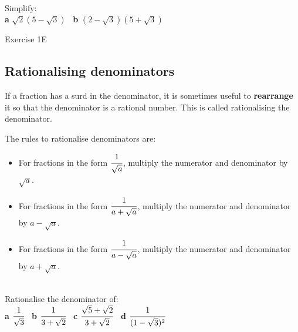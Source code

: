 \documentclass[fleqn]{article}
\begin{document}
\vspace{5cm}
\begin{examplebox}{}{}
	\\ %
	Simplify: \\
	\textbf{a}\hspace{2mm} $\sqrt{2}(5-\sqrt{3})$		\hspace{20mm} \
	\textbf{b}\hspace{2mm} $(2-\sqrt{3})(5+\sqrt{3})$	\hspace{20mm}
\end{examplebox}

\vfill
\begin{practice*}{Exercise 1E}{}
\end{practice*}
\newpage




\subsection{Rationalising denominators}
\begin{mybox2}[colbacktitle=green]{}
	If a fraction has a surd in the denominator, it is sometimes useful to \textbf{rearrange} it so that the denominator is a rational number. This is called rationalising the denominator.
	\vspace{2mm}

	\textbullet\space The rules to rationalise denominators are:\vspace{-2mm}
	\begin{itemize}
		\setlength{\itemsep}{-3pt}%
		\item For fractions in the form $\cfrac{1}{\sqrt{a}}$, multiply the numerator and denominator by $\sqrt{a}$.
		\item For fractions in the form $\cfrac{1}{a+\sqrt{a}}$, multiply the numerator and denominator by $a-\sqrt{a}$.
		\item For fractions in the form $\cfrac{1}{a-\sqrt{a}}$, multiply the numerator and denominator by $a+\sqrt{a}$.
	\end{itemize}

\end{mybox2}
\begin{examplebox}{}{}
	\\ %
	Rationalise the denominator of: \\
	\textbf{a}\hspace{2mm} $\cfrac{1}{\sqrt{3}}$						\hspace{20mm} \
	\textbf{b}\hspace{2mm} $\cfrac{1}{3+\sqrt{2}}$					\hspace{20mm} \
	\textbf{c}\hspace{2mm} $\cfrac{\sqrt{5}+\sqrt{2}}{3+\sqrt{2}}$	\hspace{20mm} \
	\textbf{d}\hspace{2mm} $\cfrac{1}{(1-\sqrt{3})^2}$				\hspace{20mm} \
\end{examplebox}
\end{document}
